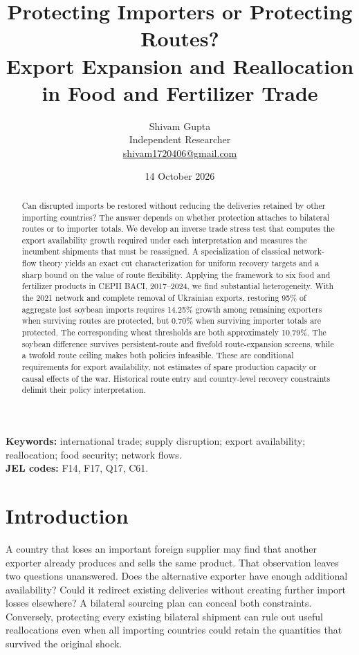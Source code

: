 \documentclass[11pt,a4paper]{article}
\title{Protecting Importers or Protecting Routes?\\[3pt]\large Export Expansion and Reallocation in Food and Fertilizer Trade}
\author{Shivam Gupta\\\normalsize Independent Researcher\\\normalsize\href{mailto:shivam1720406@gmail.com}{shivam1720406@gmail.com}}
\date{14 October 2026}
\begin{document}
\maketitle
\begin{abstract}
Can disrupted imports be restored without reducing the deliveries retained by other importing countries? The answer depends on whether protection attaches to bilateral routes or to importer totals. We develop an inverse trade stress test that computes the export availability growth required under each interpretation and measures the incumbent shipments that must be reassigned. A specialization of classical network-flow theory yields an exact cut characterization for uniform recovery targets and a sharp bound on the value of route flexibility. Applying the framework to six food and fertilizer products in CEPII BACI, 2017--2024, we find substantial heterogeneity. With the 2021 network and complete removal of Ukrainian exports, restoring 95\% of aggregate lost soybean imports requires 14.25\% growth among remaining exporters when surviving routes are protected, but 0.70\% when surviving importer totals are protected. The corresponding wheat thresholds are both approximately 10.79\%. The soybean difference survives persistent-route and fivefold route-expansion screens, while a twofold route ceiling makes both policies infeasible. These are conditional requirements for export availability, not estimates of spare production capacity or causal effects of the war. Historical route entry and country-level recovery constraints delimit their policy interpretation.
\end{abstract}
\noindent\textbf{Keywords:} international trade; supply disruption; export availability; reallocation; food security; network flows.\\
\textbf{JEL codes:} F14, F17, Q17, C61.

\section{Introduction}
A country that loses an important foreign supplier may find that another exporter already produces and sells the same product. That observation leaves two questions unanswered. Does the alternative exporter have enough additional availability? Could it redirect existing deliveries without creating further import losses elsewhere? A bilateral sourcing plan can conceal both constraints. Conversely, protecting every existing bilateral shipment can rule out useful reallocations even when all importing countries could retain the quantities that survived the original shock.
\end{document}
